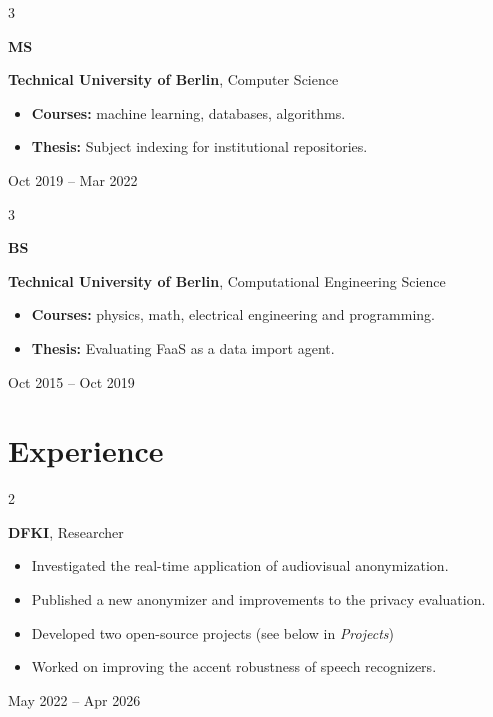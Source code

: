 \documentclass[10pt, letterpaper]{article}
\newenvironment{highlights}{
    \begin{itemize}[
        topsep=0.10 cm,
        parsep=0.10 cm,
        partopsep=0pt,
        itemsep=0pt,
        leftmargin=0.4 cm + 10pt
    ]
}{
    \end{itemize}
} %
\newenvironment{twocolentry}[2][]{
    \onecolentry
    \def\secondColumn{#2}
    \setcolumnwidth{\fill, 4.5 cm}
    \begin{paracol}{2}
}{
    \switchcolumn \raggedleft \secondColumn
    \end{paracol}
    \endonecolentry
} %
\newenvironment{threecolentry}[3][]{
    \onecolentry
    \def\thirdColumn{#3}
    \setcolumnwidth{1 cm, \fill, 4.5 cm}
    \begin{paracol}{3}
    {\raggedright #2} \switchcolumn
}{
    \switchcolumn \raggedleft \thirdColumn
    \end{paracol}
    \endonecolentry
} %
\begin{document}
        \begin{threecolentry}{\textbf{MS}}{
            Oct 2019 – Mar 2022
        }
            \textbf{Technical University of Berlin}, Computer Science
            \begin{highlights}
                \item \textbf{Courses:} machine learning, databases, algorithms.
                \item \textbf{Thesis:} Subject indexing for institutional repositories.
            \end{highlights}
        \end{threecolentry}

        \begin{threecolentry}{\textbf{BS}}{
            Oct 2015 – Oct 2019
        }
            \textbf{Technical University of Berlin}, Computational Engineering Science
            \begin{highlights}
                \item \textbf{Courses:} physics, math, electrical engineering and programming.
                \item \textbf{Thesis:} Evaluating FaaS as a data import agent.
            \end{highlights}
        \end{threecolentry}
    
    \section{Experience}
   
        \begin{twocolentry}{
            May 2022 – Apr 2026
        }
            \textbf{DFKI}, Researcher
            \begin{highlights}
                \item Investigated the real-time application of audiovisual anonymization.
                \item Published a new anonymizer and improvements to the privacy evaluation.
                \item Developed two open-source projects (see below in \textit{Projects}) 
                \item Worked on improving the accent robustness of speech recognizers.
            \end{highlights}
        \end{twocolentry}

        \vspace{0.1 cm}
\end{document}
